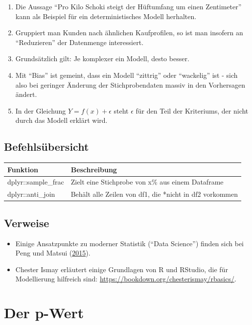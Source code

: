 \documentclass[12pt,ngerman,]{book}
\providecommand{\tightlist}{%
  \setlength{\itemsep}{0pt}\setlength{\parskip}{0pt}}
\begin{document}
\begin{enumerate}
\def\labelenumi{\arabic{enumi}.}
\tightlist
\item
  Die Aussage ``Pro Kilo Schoki steigt der Hüftumfang um einen
  Zentimeter'' kann als Beispiel für ein deterministisches Modell
  herhalten.
\item
  Gruppiert man Kunden nach ähnlichen Kaufprofilen, so ist man insofern
  an ``Reduzieren'' der Datenmenge interessiert.
\item
  Grundsätzlich gilt: Je komplexer ein Modell, desto besser.
\item
  Mit ``Bias'' ist gemeint, dass ein Modell ``zittrig'' oder
  ``wackelig'' ist - sich also bei geringer Änderung der
  Stichprobendaten massiv in den Vorhersagen ändert.
\item
  In der Gleichung \(Y=f(x)+\epsilon\) steht \(\epsilon\) für den Teil
  der Kriteriums, der nicht durch das Modell erklärt wird.
\end{enumerate}

\section{Befehlsübersicht}\label{befehlsubersicht-6}

\begin{longtable}[]{@{}ll@{}}
\toprule
Funktion & Beschreibung\tabularnewline
\midrule
\endhead
dplyr::sample\_frac & Zielt eine Stichprobe von x\% aus einem
Dataframe\tabularnewline
dplyr::anti\_join & Behält alle Zeilen von df1, die *nicht in df2
vorkommen\tabularnewline
\bottomrule
\end{longtable}

\section{Verweise}\label{verweise-5}

\begin{itemize}
\item
  Einige Ansatzpunkte zu moderner Statistik (``Data Science'') finden
  sich bei Peng und Matsui (\protect\hyperlink{ref-peng2015art}{2015}).
\item
  Chester Ismay erläutert einige Grundlagen von R und RStudio, die für
  Modellierung hilfreich sind:
  \url{https://bookdown.org/chesterismay/rbasics/}.
\end{itemize}

\chapter{Der p-Wert}\label{der-p-wert}
\end{document}
